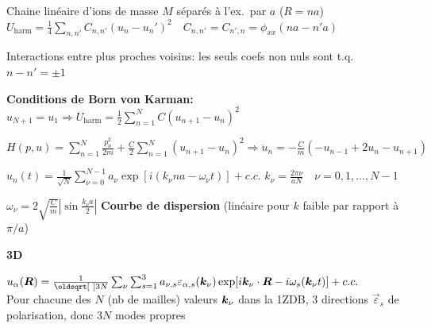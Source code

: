 \begin{squishlist}
    \item Chaine linéaire d'ions de masse $M$ séparés à l'ex.\ par $a$ ($R = na$)\\
    $U_{\text{harm}} = \frac{1}{4} \sum_{n,n'} C_{n,n'}(u_n - u_n')^2 \quad C_{n,n'} = C_{n',n} = \phi_{xx}(na - n'a)$
    \item Interactions entre plus proches voisins: les seuls coefs non nuls sont t.q.\ $n-n'= \pm 1$
    \item \textbf{Conditions de Born von Karman:} $u_{N+1} = u_1 \Longrightarrow U_{\text{harm}} = \frac{1}{2}\sum_{n=1}^{N}C(u_{n+1}-u_n)^2$
    \item $H(p,u) = \sum_{n=1}^{N}\frac{p^2_n}{2m} + \frac{C}{2}\sum_{n=1}^{N}(u_{n+1} - u_n)^2 \Longrightarrow \ddot{u}_n = -\frac{C}{m}(-u_{n-1}+2u_n - u_{n+1})$
    \item $u_n(t) = \frac{1}{\sqrt{N}} \sum_{\nu=0}^{N-1}a_{\nu} \exp[ i (k_{\nu}na - \omega_{\nu}t)] + c.c.$ \quad $k_{\nu} = \frac{2\pi \nu}{aN} \quad \nu = 0,1,\ldots, N-1$ 
    \item $\omega_{\nu} = 2 \sqrt{\frac{C}{m}} \left| \sin \frac{k_{\nu}a}{2}\right|$ \textbf{Courbe de dispersion} (linéaire pour $k$ faible par rapport à $\pi/a$)

    \squishline

    \textbf{3D}
    \item $u_{\alpha}(\vR) = \frac{1}{\sqrt{3N}}\sum_{\nu}\sum_{s=1}^{3} a_{\nu,s} \varepsilon_{\alpha,s}(\vk_{\nu}) \exp [i \vk_{\nu} \cdot \vR - i \omega_s(\vk_{\nu}t)] + c.c.$ \\ 
    Pour chacune des $N$ (nb de mailles) valeurs $\bm{k}_{\nu}$ dans la 1ZDB, 3 directions $\vec{\varepsilon}_s$ de polarisation, donc $3N$ modes propres

\end{squishlist}

